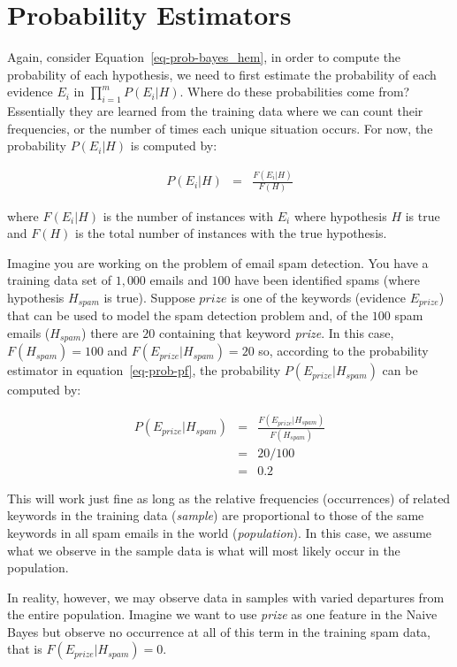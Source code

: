 \documentclass[
  letterpaper,
]{scrbook}
\begin{document}
\section{Probability Estimators}\label{probability-estimators}

Again, consider
Equation~\hyperref[eq-prob-bayes_hem]{{[}eq-prob-bayes\_hem{]}}, in
order to compute the probability of each hypothesis, we need to first
estimate the probability of each evidence \(E_i\) in
\(\prod_{i=1}^{m} P(E_i|H)\). Where do these probabilities come from?
Essentially they are learned from the training data where we can count
their frequencies, or the number of times each unique situation occurs.
For now, the probability \(P(E_i | H)\) is computed by:

\[\begin{aligned}
P(E_i | H) & = & \frac{F(E_i | H)}{F(H)}
\end{aligned}\]

where \(F(E_i | H)\) is the number of instances with \(E_i\) where
hypothesis \(H\) is true and \(F(H)\) is the total number of instances
with the true hypothesis.

Imagine you are working on the problem of email spam detection. You have
a training data set of \(1,000\) emails and \(100\) have been identified
spams (where hypothesis \(H_{spam}\) is true). Suppose \(prize\) is one
of the keywords (evidence \(E_{prize}\)) that can be used to model the
spam detection problem and, of the \(100\) spam emails (\(H_{spam}\))
there are \(20\) containing that keyword \emph{prize}. In this case,
\(F(H_{spam}) = 100\) and \(F(E_{prize} | H_{spam}) = 20\) so, according
to the probability estimator in
equation~\hyperref[eq-prob-pf]{{[}eq-prob-pf{]}}, the probability
\(P(E_{prize} | H_{spam})\) can be computed by:

\[\begin{aligned}
P(E_{prize} | H_{spam})
  & = & \frac{F(E_{prize} | H_{spam})}{F(H_{spam})} \\
  & = & 20 / 100 \\
  & = & 0.2
\end{aligned}\]

This will work just fine as long as the relative frequencies
(occurrences) of related keywords in the training data (\emph{sample})
are proportional to those of the same keywords in all spam emails in the
world (\emph{population}). In this case, we assume what we observe in
the sample data is what will most likely occur in the population.

In reality, however, we may observe data in samples with varied
departures from the entire population. Imagine we want to use
\emph{prize} as one feature in the Naive Bayes but observe no occurrence
at all of this term in the training spam data, that is
\(F(E_{prize} | H_{spam}) = 0\).
\end{document}
